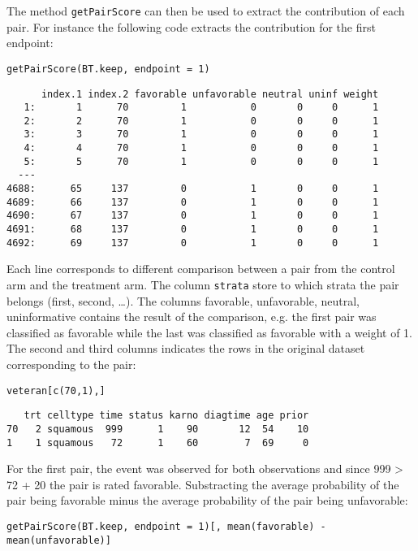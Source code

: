 \documentclass[12pt]{article}
\begin{document}
The method \texttt{getPairScore} can then be used to extract the contribution
of each pair. For instance the following code extracts the
contribution for the first endpoint:
\lstset{language=r,label= ,caption= ,captionpos=b,numbers=none}
\begin{lstlisting}
getPairScore(BT.keep, endpoint = 1)
\end{lstlisting}

\begin{verbatim}
      index.1 index.2 favorable unfavorable neutral uninf weight
   1:       1      70         1           0       0     0      1
   2:       2      70         1           0       0     0      1
   3:       3      70         1           0       0     0      1
   4:       4      70         1           0       0     0      1
   5:       5      70         1           0       0     0      1
  ---                                                           
4688:      65     137         0           1       0     0      1
4689:      66     137         0           1       0     0      1
4690:      67     137         0           1       0     0      1
4691:      68     137         0           1       0     0      1
4692:      69     137         0           1       0     0      1
\end{verbatim}

Each line corresponds to different comparison between a pair from the
control arm and the treatment arm. The column \texttt{strata} store to which
strata the pair belongs (first, second, \ldots{}). The columns favorable,
unfavorable, neutral, uninformative contains the result of the
comparison, e.g. the first pair was classified as favorable while the
last was classified as favorable with a weight of 1. The second and
third columns indicates the rows in the original dataset corresponding
to the pair:
\lstset{language=r,label= ,caption= ,captionpos=b,numbers=none}
\begin{lstlisting}
veteran[c(70,1),]
\end{lstlisting}

\begin{verbatim}
   trt celltype time status karno diagtime age prior
70   2 squamous  999      1    90       12  54    10
1    1 squamous   72      1    60        7  69     0
\end{verbatim}


For the first pair, the event was observed for both observations and
since 999 > 72 + 20 the pair is rated favorable. Substracting the
average probability of the pair being favorable minus the average
probability of the pair being unfavorable:
\lstset{language=r,label= ,caption= ,captionpos=b,numbers=none}
\begin{lstlisting}
getPairScore(BT.keep, endpoint = 1)[, mean(favorable) - mean(unfavorable)]
\end{lstlisting}
\end{document}

